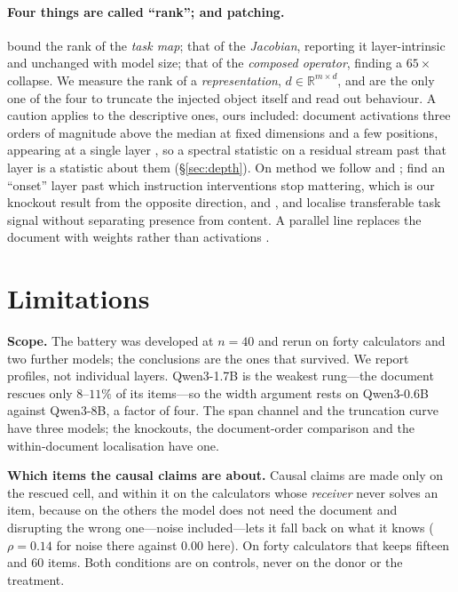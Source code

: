 \documentclass{article}
\newcommand{\dvec}{\ensuremath{d}}
\begin{document}
\paragraph{Four things are called ``rank''; and patching.}
\citet{dong2026taskvectorlimits} bound the rank of the \emph{task map};
\citet{sarkar2026causaldim} that of the \emph{Jacobian}, reporting it
layer-intrinsic and unchanged with model size;
\citet{fernando2026residualspectral} that of the \emph{composed operator},
finding a $65\times$ collapse. We measure the rank of a \emph{representation},
$\dvec\in\mathbb{R}^{m\times d}$, and are the only one of the four to truncate
the injected object itself and read out behaviour. A caution applies to the
descriptive ones, ours included: \citet{sun2024massive} document activations
three orders of magnitude above the median at fixed dimensions and a few
positions, appearing at a single layer \citep{shi2026melayer}, so a spectral
statistic on a residual stream past that layer is a statistic about them
(\S\ref{sec:depth}). On method we follow \citet{zhang2023bestpractices} and
\citet{heimersheim2024patching}; \citet{onset2025instruction} find an ``onset''
layer past which instruction interventions stop mattering, which is our knockout
result from the opposite direction, and \citet{jit2025taskrepr},
\citet{semanticconflicts2026} and \citet{ragcite2026} localise transferable task
signal without separating presence from content. A parallel line replaces the
document with weights rather than activations \citep{doc2lora2026,
deepcontextdistill2025}.

\section{Limitations}

\textbf{Scope.} The battery was developed at $n=40$ and rerun on forty
calculators and two further models; the conclusions are the ones that survived.
We report profiles, not individual layers. Qwen3-1.7B is the weakest rung---the
document rescues only $8$--$11\%$ of its items---so the width argument rests on
Qwen3-0.6B against Qwen3-8B, a factor of four. The span channel and the
truncation curve have three models; the knockouts, the document-order comparison
and the within-document localisation have one.

\textbf{Which items the causal claims are about.} Causal claims are made only on
the rescued cell, and within it on the calculators whose \emph{receiver} never
solves an item, because on the others the model does not need the document and
disrupting the wrong one---noise included---lets it fall back on what it knows
($\rho=0.14$ for noise there against $0.00$ here). On forty calculators that
keeps fifteen and $60$ items. Both conditions are on controls, never on the
donor or the treatment.
\end{document}
